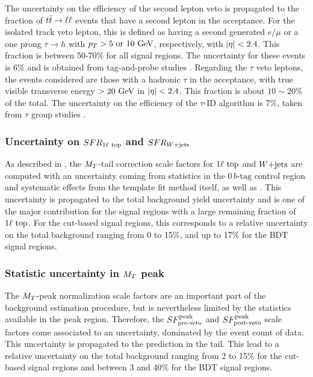             The uncertainty on the efficiency of the second lepton veto is propagated to the
            fraction of $t\bar{t} \rightarrow \ell \ell$ events that have a second lepton in the acceptance. For
            the isolated track veto lepton, this is defined as having a second generated
            $e/\mu$ or a one prong $\tau \rightarrow h$ with $p_T > 5 \text{ or } 10 ~\text{GeV}$,
            respectively, with $\left| \eta \right| < 2.4$. This fraction is between 50-70\% for all
            signal regions. The uncertainty for these events is 6\% and is obtained from
            tag-and-probe studies \cite{AN-2013-89}. Regarding the $\tau$ veto leptons, the
            events considered are those with a hadronic $\tau$ in the acceptance, with
            true visible transverse energy $> 20~\text{GeV}$ in $\left| \eta \right| < 2.4$. This fraction is
            about $10 \sim 20 \%$ of the total. The uncertainty on the efficiency of the
            $\tau$-ID algorithm is 7\%, taken from $\tau$ group studies \cite{TauID}.

            \subsubsection{Uncertainty on $SFR_{1\ell~\text{top}}$ and $SFR_{\text{$W$+jets}}$}

            As described in , the $M_T$-tail correction
            scale factors for $1\ell~\text{top}$ and $\text{$W$+jets}$ are computed with an uncertainty
            coming from statistics in the $0\, b\text{-tag}$ control region and systematic effects
            from the template fit method itself, as well as . This uncertainty is propagated
            to the total background yield uncertainty and is one of the major contribution
            for the signal regions with a large remaining fraction of $1\ell~\text{top}$.
            For the cut-based signal regions, this corresponds to a relative uncertainty
            on the total background ranging from 0 to 15\%, and up to 17\% for the BDT
            signal regions.

            \subsubsection{Statistic uncertainty in $M_T$ peak}

            The $M_T$-peak normalization scale factors are an important part of the background
            estimation procedure, but is nevertheless limited by the statistics available
            in the peak region. Therefore, the $SF_{\text{pre-veto}}^{\text{peak}}$ and $SF_{\text{post-veto}}^{\text{peak}}$ scale factors come
            associated to an uncertainty, dominated by the event count of data. This
            uncertainty is propagated to the prediction in the tail. This lead to a
            relative uncertainty on the total background ranging from 2 to 15\% for the cut-based
            signal regions and between 3 and 40\% for the BDT signal regions.

